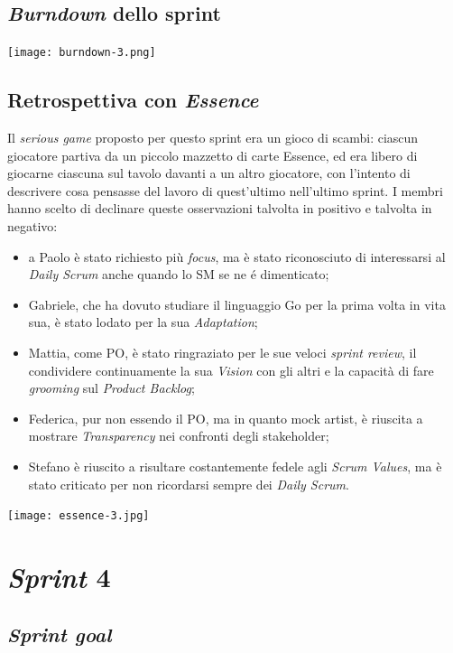 \documentclass{article}
\begin{document}
\subsection{\emph{Burndown} dello sprint}

\texttt{[image: burndown-3.png]}

\subsection{Retrospettiva con \emph{Essence}}

Il \emph{serious game} proposto per questo sprint era un gioco di scambi:
ciascun giocatore partiva da un piccolo mazzetto di carte Essence, ed era libero
di giocarne ciascuna sul tavolo davanti a un altro giocatore, con l'intento di
descrivere cosa pensasse del lavoro di quest'ultimo nell'ultimo sprint. I membri
hanno scelto di declinare queste osservazioni talvolta in positivo e talvolta in
negativo:
\begin{itemize}
	\item a Paolo è stato richiesto più \emph{focus}, ma è stato riconosciuto di
	      interessarsi al \emph{Daily Scrum} anche quando lo SM se ne é dimenticato;
	\item Gabriele, che ha dovuto studiare il linguaggio Go per la prima volta in
	      vita sua, è stato lodato per la sua \emph{Adaptation};
	\item Mattia, come PO, è stato ringraziato per le sue veloci \emph{sprint
		      review}, il condividere continuamente la sua \emph{Vision} con gli altri e
	      la capacità di fare \emph{grooming} sul \emph{Product Backlog};
	\item Federica, pur non essendo il PO, ma in quanto mock artist, è riuscita a
	      mostrare \emph{Transparency} nei confronti degli stakeholder;
	\item Stefano è riuscito a risultare costantemente fedele agli \emph{Scrum
		      Values}, ma è stato criticato per non ricordarsi sempre dei \emph{Daily
		      Scrum}.
\end{itemize}

\texttt{[image: essence-3.jpg]}

\section{\emph{Sprint} 4}

\subsection{\emph{Sprint goal}}
\end{document}
